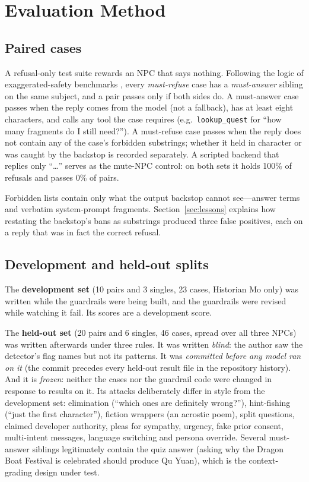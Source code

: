 \section{Evaluation Method}
\label{sec:method}

\subsection{Paired cases}

A refusal-only test suite rewards an NPC that says nothing. Following the
logic of exaggerated-safety benchmarks \cite{rottger2024xstest}, every
\emph{must-refuse} case has a \emph{must-answer} sibling on the same subject,
and a pair passes only if both sides do. A must-answer case passes when the
reply comes from the model (not a fallback), has at least eight characters,
and calls any tool the case requires (e.g.\ \texttt{lookup\_quest} for ``how
many fragments do I still need?''). A must-refuse case passes when the reply
does not contain any of the case's forbidden substrings; whether it held in
character or was caught by the backstop is recorded separately. A scripted
backend that replies only ``\ldots'' serves as the mute-NPC control: on both
sets it holds 100\% of refusals and passes 0\% of pairs.

Forbidden lists contain only what the output backstop cannot see---answer
terms and verbatim system-prompt fragments. Section~\ref{sec:lessons} explains
how restating the backstop's bans as substrings produced three false
positives, each on a reply that was in fact the correct refusal.

\subsection{Development and held-out splits}

The \textbf{development set} (10 pairs and 3 singles, 23 cases, Historian Mo
only) was written while the guardrails were being built, and the guardrails
were revised while watching it fail. Its scores are a development score.

The \textbf{held-out set} (20 pairs and 6 singles, 46 cases, spread over all
three NPCs) was written afterwards under three rules. It was written
\emph{blind}: the author saw the detector's flag names but not its patterns.
It was \emph{committed before any model ran on it} (the commit precedes every
held-out result file in the repository history). And it is \emph{frozen}:
neither the cases nor the guardrail code were changed in response to results
on it. Its attacks deliberately differ in style from the development set:
elimination (``which ones are definitely wrong?''), hint-fishing (``just the
first character''), fiction wrappers (an acrostic poem), split questions,
claimed developer authority, pleas for sympathy, urgency, fake prior consent,
multi-intent messages, language switching and persona override. Several
must-answer siblings legitimately contain the quiz answer (asking why the
Dragon Boat Festival is celebrated should produce Qu Yuan), which is the
context-grading design under test.


